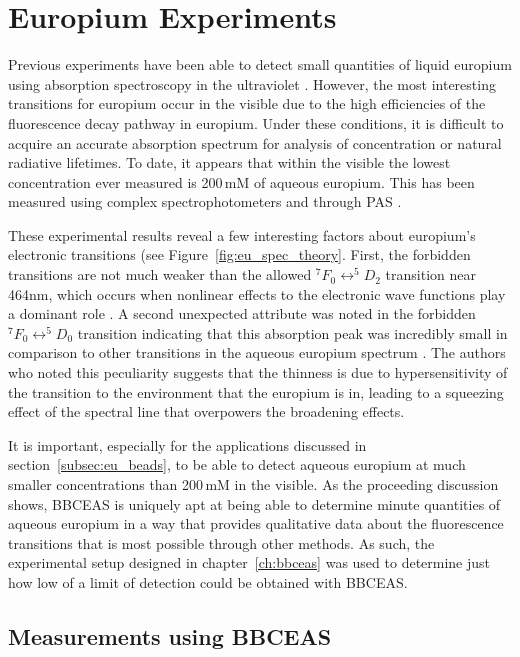 \chapter{Europium Experiments}\label{ch:eu_exp}

Previous experiments have been able to detect small quantities of liquid
europium using absorption spectroscopy in the ultraviolet \cite{Yun:2001wc}.
However, the most interesting transitions for europium occur in the visible due
to the high efficiencies of the fluorescence decay pathway in europium. Under
these conditions, it is difficult to acquire an accurate absorption spectrum
for analysis of concentration or natural radiative lifetimes. To date, it
appears that within the visible the lowest concentration ever measured is
200\,mM of aqueous europium. This has been measured using complex
spectrophotometers and through \ac{PAS} \cite{Sawada:1979vca}.

These experimental results reveal a few interesting factors about
europium's electronic transitions (see Figure~\ref{fig:eu_spec_theory}.
First, the forbidden transitions are not much weaker than the allowed
$^7F_0 \leftrightarrow ^5D_2$ transition near 464nm, which occurs when
nonlinear effects to the electronic wave functions play a dominant role
\cite{Walsh:2005te}. A second unexpected attribute was noted in the forbidden
$^7F_0 \leftrightarrow ^5D_0$ transition indicating that this absorption
peak was incredibly small in comparison to other transitions in the aqueous
europium spectrum \cite{Sawada:1979vca}. The authors who noted this
peculiarity suggests that the thinness is due to hypersensitivity of the
transition to the environment that the europium is in, leading to a squeezing
effect of the spectral line that overpowers the broadening effects.

It is important, especially for the applications discussed in
section~\ref{subsec:eu_beads}, to be able to detect aqueous europium at much
smaller concentrations than 200\,mM in the visible. As the proceeding
discussion shows, \ac{BBCEAS} is uniquely apt at being able to determine minute
quantities of aqueous europium in a way that provides qualitative data about
the fluorescence transitions that is most possible through other methods. As
such, the experimental setup designed in chapter~\ref{ch:bbceas} was used to
determine just how low of a limit of detection could be obtained with
\ac{BBCEAS}.



\section{Measurements using BBCEAS}\label{sec:eu_measurements}

